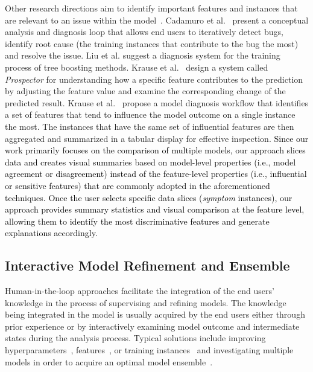 \documentclass[preprint,journal]{vgtc}       %
\newcommand{\revcolor}{black}
\begin{document}
Other research directions aim to identify important features and instances that are relevant to an issue within the model~\cite{Cadamuro2016Debugging, Krause2016interacting, krause2017workflow, kulesza2015principles, kulesza2010explanatory}. Cadamuro et al.~\cite{Cadamuro2016Debugging} present a conceptual analysis and diagnosis loop that allows end users to iteratively detect bugs, identify root cause (the training instances that contribute to the bug the most) and resolve the issue. Liu et al.\cite{liu2018visual} suggest a diagnosis system for the training process of tree boosting methods. Krause et al.~\cite{Krause2016interacting} design a system called \textit{Prospector} for understanding how a specific feature contributes to the prediction by adjusting the feature value and examine the corresponding change of the predicted result. Krause et al.~\cite{krause2017workflow} propose a model diagnosis workflow that identifies a set of features that tend to influence the model outcome on a single instance the most. The instances that have the same set of influential features are then aggregated and summarized in a tabular display for effective inspection. \textcolor{\revcolor}{Since our work primarily focuses on the comparison of multiple models, our approach slices data and creates visual summaries based on model-level properties (i.e., model agreement or disagreement) instead of the feature-level properties (i.e., influential or sensitive features) that are commonly adopted in the aforementioned techniques. Once the user selects specific data slices (\textit{symptom} instances), our approach provides summary statistics and visual comparison at the feature level, allowing them to identify the most discriminative features and generate explanations accordingly.}

\subsection{Interactive Model Refinement and Ensemble}
Human-in-the-loop approaches facilitate the integration of the end users' knowledge in the process of supervising and refining models. The knowledge being integrated in the model is usually acquired by the end users either through prior experience or by interactively examining model outcome and intermediate states during the analysis process. Typical solutions include improving hyperparameters~\cite{kapoor2010interactive, choo2013utopian}, features~\cite{brooks2015featureinsight, zhao2014lovis, muhlbacher2013partition}, or training instances~\cite{paiva2015approach} and investigating multiple models in order to acquire an optimal model ensemble~\cite{talbot2009ensemblematrix, schneider2017visual, zhao2014lovis}.
\end{document}
